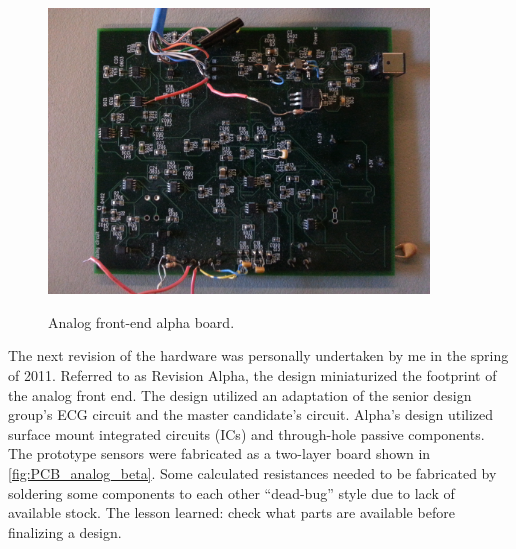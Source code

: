 \begin{figure}
	\begin{center}
		\label{fig:PCB_alpha}
		\includegraphics[scale=1,width=0.9\textwidth]{Images/PCB_Alpha.jpg} 
		\caption{Analog front-end alpha board.}
	\end{center}
\end{figure}

The next revision of the hardware was personally undertaken by me in the spring of 2011. Referred to as Revision Alpha, the design miniaturized the footprint of the analog front end. The design utilized an adaptation of the senior design group's ECG circuit and the master candidate's  circuit. Alpha's design utilized surface mount integrated circuits (ICs) and through-hole passive components. The prototype sensors were fabricated as a two-layer board shown in \cref{fig:PCB_analog_beta}. Some calculated resistances needed to be fabricated by soldering some components to each other “dead-bug” style due to lack of available stock. The lesson learned: check what parts are available before finalizing a design.

